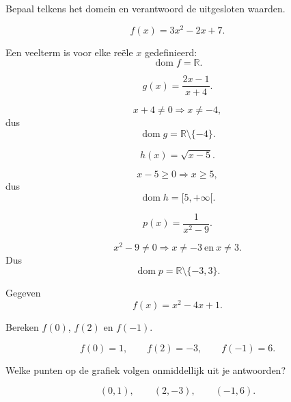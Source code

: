 \documentclass{ximera}
\begin{document}
\begin{oefening}{\oefB\ESS}

Bepaal telkens het domein en verantwoord de uitgesloten waarden.

\begin{question}
\[
f(x)=3x^2-2x+7.
\]
\begin{oplossing}
Een veelterm is voor elke reële \(x\) gedefinieerd:
\[
\operatorname{dom}f=\mathbb{R}.
\]
\end{oplossing}
\end{question}

\begin{question}
\[
g(x)=\frac{2x-1}{x+4}.
\]
\begin{oplossing}
\[
x+4\neq0\Longrightarrow x\neq-4,
\]
dus
\[
\operatorname{dom}g=\mathbb{R}\setminus\{-4\}.
\]
\end{oplossing}
\end{question}

\begin{question}
\[
h(x)=\sqrt{x-5}.
\]
\begin{oplossing}
\[
x-5\geq0\Longrightarrow x\geq5,
\]
dus
\[
\operatorname{dom}h=[5,+\infty[.
\]
\end{oplossing}
\end{question}

\begin{question}
\[
p(x)=\frac{1}{x^2-9}.
\]
\begin{oplossing}
\[
x^2-9\neq0\Longrightarrow x\neq-3\ \text{en}\ x\neq3.
\]
Dus
\[
\operatorname{dom}p=\mathbb{R}\setminus\{-3,3\}.
\]
\end{oplossing}
\end{question}

\end{oefening}

\begin{oefening}[Beelden]{\oefB\ESS}

Gegeven
\[
f(x)=x^2-4x+1.
\]

\begin{question}
Bereken \(f(0)\), \(f(2)\) en \(f(-1)\).

\begin{oplossing}
\[
f(0)=1,\qquad f(2)=-3,\qquad f(-1)=6.
\]
\end{oplossing}
\end{question}

\begin{question}
Welke punten op de grafiek volgen onmiddellijk uit je antwoorden?

\begin{oplossing}
\[
(0,1),\qquad(2,-3),\qquad(-1,6).
\]
\end{oplossing}
\end{question}

\end{oefening}
\end{document}
